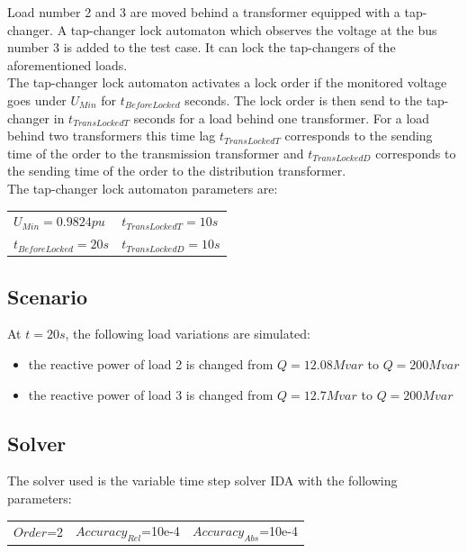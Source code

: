 \documentclass[a4paper, 12pt]{report}
\begin{document}
Load number 2 and 3 are moved behind a transformer equipped with a tap-changer. A tap-changer lock automaton which observes the voltage at the bus number 3 is added to the test case. It can lock the tap-changers of the aforementioned loads. \\

The tap-changer lock automaton activates a lock order if the monitored voltage goes under $U_{Min}$ for $t_{BeforeLocked}$ seconds. The lock order is then send to the tap-changer in $t_{TransLockedT}$ seconds for a load behind one transformer. For a load behind two transformers this time lag $t_{TransLockedT}$ corresponds to the sending time of the order to the transmission transformer and $t_{TransLockedD}$ corresponds to the sending time of the order to the distribution transformer. \\

The tap-changer lock automaton parameters are:
\begin{center}
\begin{tabular}{l|l}
   $U_{Min}=0.9824pu$ & $t_{TransLockedT}=10s$ \\
   $t_{BeforeLocked}=20s$  & $t_{TransLockedD}=10s$ \\
\end{tabular}
\end{center}

\subsection{Scenario}
At $t=20s$, the following load variations are simulated:
\begin{itemize}
\item{the reactive power of load 2 is changed from $Q=12.08Mvar$ to $Q=200Mvar$}
\item{the reactive power of load 3 is changed from $Q=12.7Mvar$ to $Q=200Mvar$}
\end{itemize}

\subsection{Solver}
The solver used is the variable time step solver IDA with the following parameters:
\begin{center}
\begin{tabular}{l|l|l}
   $Order$=2 & $Accuracy_{Rel}$=10e-4 & $Accuracy_{Abs}$=10e-4 \\
\end{tabular}
\end{center}
\end{document}
